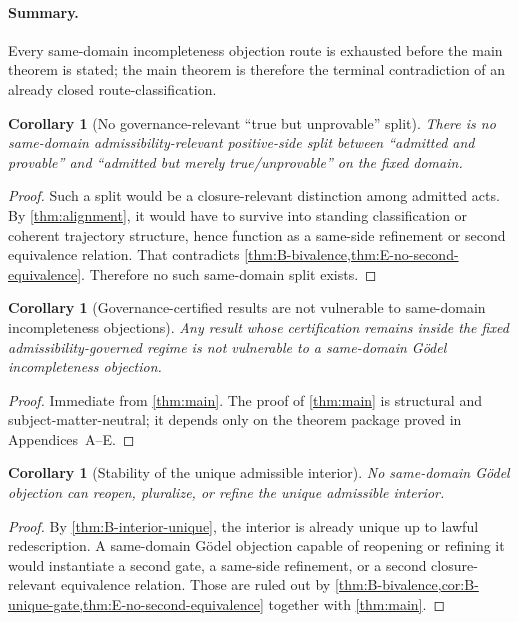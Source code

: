 \documentclass[11pt]{article}
\theoremstyle{plain}
\newtheorem{corollary}[theorem]{Corollary}
\theoremstyle{definition}
\begin{document}
\paragraph{Summary.} Every same-domain incompleteness objection route is exhausted before the main theorem is stated; the main theorem is therefore the terminal contradiction of an already closed route-classification.

\begin{corollary}[No governance-relevant ``true but unprovable'' split]
\label{cor:true-unprovable}
There is no same-domain admissibility-relevant positive-side split between ``admitted and provable'' and ``admitted but merely true/unprovable'' on the fixed domain.
\end{corollary}

\begin{proof}
Such a split would be a closure-relevant distinction among admitted acts. By \cref{thm:alignment}, it would have to survive into standing classification or coherent trajectory structure, hence function as a same-side refinement or second equivalence relation. That contradicts \cref{thm:B-bivalence,thm:E-no-second-equivalence}. Therefore no such same-domain split exists.
\end{proof}

\begin{corollary}[Governance-certified results are not vulnerable to same-domain incompleteness objections]
\label{cor:protected-results}
Any result whose certification remains inside the fixed admissibility-governed regime is not vulnerable to a same-domain G\"odel incompleteness objection.
\end{corollary}

\begin{proof}
Immediate from \cref{thm:main}. The proof of \cref{thm:main} is structural and subject-matter-neutral; it depends only on the theorem package proved in Appendices~A--E.
\end{proof}

\begin{corollary}[Stability of the unique admissible interior]
\label{cor:interior-stable}
No same-domain G\"odel objection can reopen, pluralize, or refine the unique admissible interior.
\end{corollary}

\begin{proof}
By \cref{thm:B-interior-unique}, the interior is already unique up to lawful redescription. A same-domain G\"odel objection capable of reopening or refining it would instantiate a second gate, a same-side refinement, or a second closure-relevant equivalence relation. Those are ruled out by \cref{thm:B-bivalence,cor:B-unique-gate,thm:E-no-second-equivalence} together with \cref{thm:main}.
\end{proof}
\end{document}
